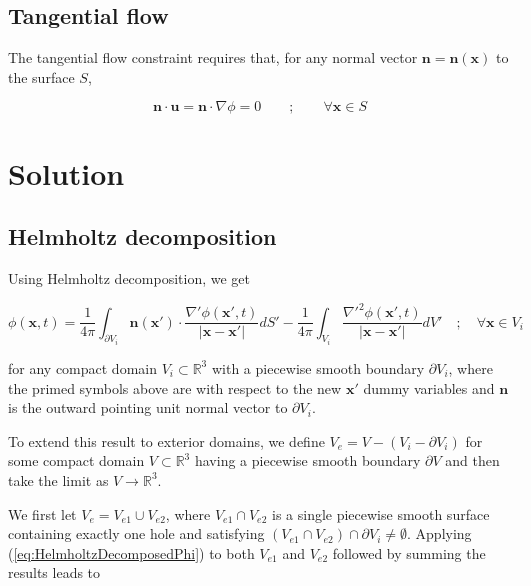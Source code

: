 \documentclass{article}
\begin{document}
\subsection{Tangential flow}

The tangential flow constraint requires that, for any normal vector $\mathbf{n}
= \mathbf{n}(\mathbf{x})$ to the surface $S$,

\begin{equation}
\label{eq:TangentialFlowConstraint}
	\mathbf{n} \cdot \mathbf{u} = \mathbf{n} \cdot \nabla \phi = 0 \qquad ;
	\qquad \forall \mathbf{x} \in S
\end{equation}

\section{Solution}

\subsection{Helmholtz decomposition}

Using Helmholtz decomposition, we get

\begin{equation}
\label{eq:HelmholtzDecomposedPhi}
	\phi(\mathbf{x}, t) = \frac{1}{4 \pi} \int_{\partial V_i} \mathbf{n}(
	\mathbf{x}') \cdot \frac{\nabla' \phi(\mathbf{x}', t)}{|\mathbf{x} -
	\mathbf{x}'|} dS' - \frac{1}{4 \pi} \int_{V_i} \frac{\nabla'^2 \phi(
	\mathbf{x}', t)}{|\mathbf{x} - \mathbf{x}'|} dV' \quad ; \quad \forall
	\mathbf{x} \in V_i
\end{equation}

for any compact domain $V_i \subset \mathbb{R}^3$ with a piecewise smooth
boundary $\partial V_i$, where the primed symbols above are with respect to the
new $\mathbf{x}'$ dummy variables and $\mathbf{n}$ is the outward pointing unit
normal vector to $\partial V_i$.

To extend this result to exterior domains, we define $V_e = V - (V_i - \partial
V_i)$ for some compact domain $V \subset \mathbb{R}^3$ having a piecewise smooth
boundary $\partial V$ and then take the limit as $V \rightarrow \mathbb{R}^3$.

We first let $V_e = V_{e1} \cup V_{e2}$, where $V_{e1} \cap V_{e2}$ is a single
piecewise smooth surface containing exactly one hole and satisfying $(V_{e1}
\cap V_{e2}) \cap \partial V_i \neq \emptyset$. Applying 
(\ref{eq:HelmholtzDecomposedPhi}) to both $V_{e1}$ and $V_{e2}$ followed by
summing the results leads to
\end{document}
